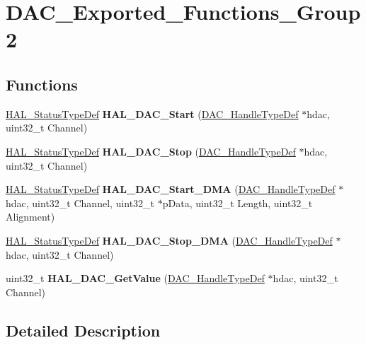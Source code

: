 \hypertarget{group___d_a_c___exported___functions___group2}{}\section{D\+A\+C\+\_\+\+Exported\+\_\+\+Functions\+\_\+\+Group2}
\label{group___d_a_c___exported___functions___group2}
\subsection*{Functions}
\begin{DoxyCompactItemize}
\item 
\mbox{\label{group___d_a_c___exported___functions___group2_ga140e6969466fdda2bfe32611ab695a8e}} 
\mbox{\hyperlink{stm32f7xx__hal__def_8h_a63c0679d1cb8b8c684fbb0632743478f}{H\+A\+L\+\_\+\+Status\+Type\+Def}} {\bfseries H\+A\+L\+\_\+\+D\+A\+C\+\_\+\+Start} (\mbox{\hyperlink{struct_d_a_c___handle_type_def}{D\+A\+C\+\_\+\+Handle\+Type\+Def}} $\ast$hdac, uint32\+\_\+t Channel)
\item 
\mbox{\label{group___d_a_c___exported___functions___group2_ga03f38e4427521c68828fa61d45e0a756}} 
\mbox{\hyperlink{stm32f7xx__hal__def_8h_a63c0679d1cb8b8c684fbb0632743478f}{H\+A\+L\+\_\+\+Status\+Type\+Def}} {\bfseries H\+A\+L\+\_\+\+D\+A\+C\+\_\+\+Stop} (\mbox{\hyperlink{struct_d_a_c___handle_type_def}{D\+A\+C\+\_\+\+Handle\+Type\+Def}} $\ast$hdac, uint32\+\_\+t Channel)
\item 
\mbox{\label{group___d_a_c___exported___functions___group2_ga97d37142050fb1c15006a170ecc47042}} 
\mbox{\hyperlink{stm32f7xx__hal__def_8h_a63c0679d1cb8b8c684fbb0632743478f}{H\+A\+L\+\_\+\+Status\+Type\+Def}} {\bfseries H\+A\+L\+\_\+\+D\+A\+C\+\_\+\+Start\+\_\+\+D\+MA} (\mbox{\hyperlink{struct_d_a_c___handle_type_def}{D\+A\+C\+\_\+\+Handle\+Type\+Def}} $\ast$hdac, uint32\+\_\+t Channel, uint32\+\_\+t $\ast$p\+Data, uint32\+\_\+t Length, uint32\+\_\+t Alignment)
\item 
\mbox{\label{group___d_a_c___exported___functions___group2_ga24e8a2a971fab50eafea143ceeea1e92}} 
\mbox{\hyperlink{stm32f7xx__hal__def_8h_a63c0679d1cb8b8c684fbb0632743478f}{H\+A\+L\+\_\+\+Status\+Type\+Def}} {\bfseries H\+A\+L\+\_\+\+D\+A\+C\+\_\+\+Stop\+\_\+\+D\+MA} (\mbox{\hyperlink{struct_d_a_c___handle_type_def}{D\+A\+C\+\_\+\+Handle\+Type\+Def}} $\ast$hdac, uint32\+\_\+t Channel)
\item 
\mbox{\label{group___d_a_c___exported___functions___group2_gad7a8f3c76cdb5bdb19d633bef147e8d0}} 
uint32\+\_\+t {\bfseries H\+A\+L\+\_\+\+D\+A\+C\+\_\+\+Get\+Value} (\mbox{\hyperlink{struct_d_a_c___handle_type_def}{D\+A\+C\+\_\+\+Handle\+Type\+Def}} $\ast$hdac, uint32\+\_\+t Channel)
\end{DoxyCompactItemize}


\subsection{Detailed Description}
